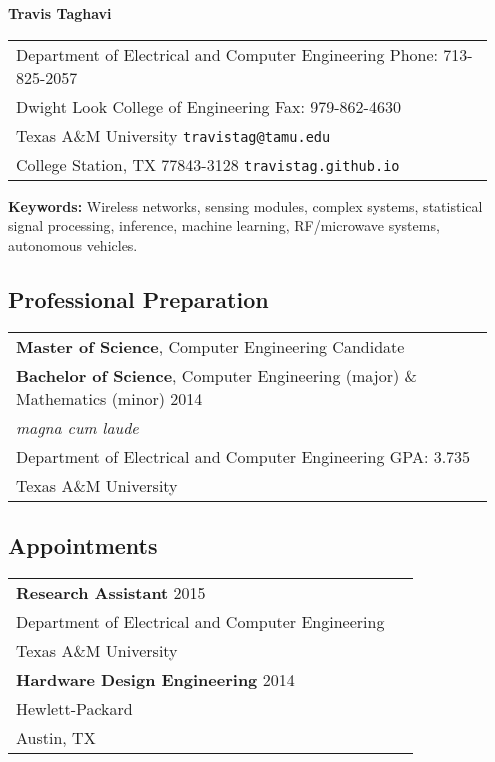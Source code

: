 \newpage

\begin{center}
{\bfseries \Large Travis Taghavi}
\end{center}

\begin{center}
\begin{tabular}{p{0.95\linewidth}}
Department of Electrical and Computer Engineering
\hfill Phone: 713-825-2057 \\
Dwight Look College of Engineering
\hfill Fax: 979-862-4630 \\
Texas A\&M University
\hfill \texttt{travistag@tamu.edu} \\
College Station, TX 77843-3128
\hfill \texttt{travistag.github.io}
\end{tabular}
\end{center}

\textbf{Keywords:} Wireless networks, sensing modules, complex systems, statistical signal processing, inference, machine learning, RF/microwave systems, autonomous vehicles.

\subsection*{Professional Preparation}

\begin{center}
\begin{tabular}{p{0.95\linewidth}}
\textbf{Master of Science}, Computer Engineering \hfill Candidate \\
\textbf{Bachelor of Science}, Computer Engineering (major) \& Mathematics (minor) \hfill 2014 \\
{\em magna cum laude}\\
Department of Electrical and Computer Engineering \hfill GPA: 3.735\\
Texas A\&M University
\end{tabular}
\end{center}

\subsection*{Appointments}

\begin{center}
\begin{tabular}{p{0.95\linewidth}}
\textbf{Research Assistant} \hfill 2015 \\
Department of Electrical and Computer Engineering \\
Texas A\&M University \\[4pt]
\textbf{Hardware Design Engineering} \hfill 2014 \\
Hewlett-Packard \\
Austin, TX
\end{tabular}
\end{center}

